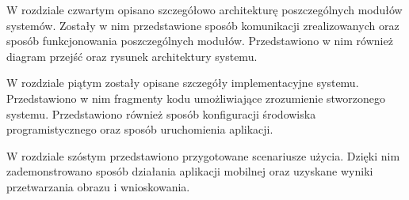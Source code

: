 W rozdziale czwartym opisano szczegółowo architekturę poszczególnych modułów systemów. Zostały w nim przedstawione sposób komunikacji zrealizowanych oraz sposób funkcjonowania poszczególnych modułów. Przedstawiono w nim również diagram przejść oraz rysunek architektury systemu.

W rozdziale piątym zostały opisane szczegóły implementacyjne systemu. Przedstawiono w nim fragmenty kodu umożliwiające zrozumienie stworzonego systemu. Przedstawiono również sposób konfiguracji środowiska programistycznego oraz sposób uruchomienia aplikacji. 

W rozdziale szóstym przedstawiono przygotowane scenariusze użycia. Dzięki nim zademonstrowano sposób działania aplikacji mobilnej oraz uzyskane wyniki przetwarzania obrazu i wnioskowania.